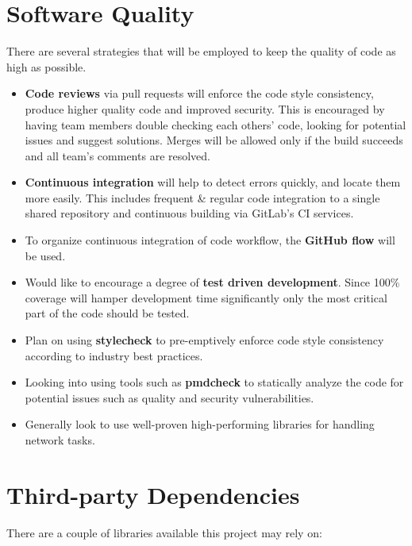 \documentclass{article}
\begin{document}
\section{Software Quality}

There are several strategies that will be employed to keep the quality of code as high as possible.

\begin{itemize}

\item \textbf{Code reviews} via pull requests will enforce the code style consistency, produce higher quality code and improved security. This is encouraged by having team members double checking each others' code, looking for potential issues and suggest solutions. Merges will be allowed only if the build succeeds and all team's comments are resolved.

\item \textbf{Continuous integration} will help to detect errors quickly, and locate them more easily. This includes frequent \& regular code integration to a single shared repository and continuous building via GitLab's CI services.

\item To organize continuous integration of code workflow, the \textbf{GitHub flow} will be used.

\item Would like to encourage a degree of \textbf{test driven development}. Since 100\% coverage will hamper development time significantly only the most critical part of the code should be tested.

\item Plan on using \textbf{stylecheck} to pre-emptively enforce code style consistency according to industry best practices.

\item Looking into using tools such as \textbf{pmdcheck} to statically analyze the code for potential issues such as quality and security vulnerabilities.

\item Generally look to use well-proven high-performing libraries for handling network tasks.

\end{itemize}

\section{Third-party Dependencies}
There are a couple of libraries available this project may rely on:
\end{document}
